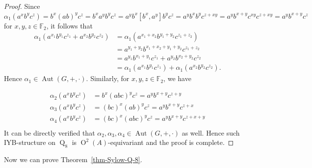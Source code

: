 \documentclass[12pt,a4paper]{article}
\DeclareMathOperator{\Oo}{O}
\DeclareMathOperator{\Aut}{Aut}
\DeclareMathOperator{\Q}{Q}
\theoremstyle{definition}
\begin{document}
\begin{proof}
Since $\alpha_1(a^xb^yc^z)=b^x(ab)^yc^z=b^xa^yb^yc^z=a^yb^x[b^x,a^y]b^yc^z
=a^yb^xb^yc^{z+xy}=a^yb^{x+y}c^{xy}c^{z+xy}=a^yb^{x+y}c^z$ for $x,y,z \in \mathbb{F}_2$, it follows that
$$
\begin{aligned}
\alpha_1(a^{x_1}b^{y_1}c^{z_1}+a^{x_2}b^{y_2}c^{z_2})&=\alpha_1(a^{x_1+x_2}b^{y_1+y_2}c^{z_1+z_2})\\
&=a^{y_1+y_2}b^{x_1+x_2+y_1+y_2}c^{z_1+z_2}\\
&=a^{y_1}b^{x_1+y_1}c^{z_1}+a^{y_2}b^{x_2+y_2}c^{z_2}\\
&=\alpha_1(a^{x_1}b^{y_1}c^{z_1})+\alpha_1(a^{x_2}b^{y_2}c^{z_2}).
\end{aligned}
$$
Hence $\alpha_1 \in \Aut(G,+,\cdot)$. Similarly, for $x,y,z \in \mathbb{F}_2$, we have

$$
\begin{aligned}
\alpha_2(a^xb^yc^z)&=b^x(abc)^yc^z=a^yb^{x+y}c^{z+y}\\
\alpha_3(a^xb^yc^z)&=(bc)^x(ab)^yc^z=a^yb^{x+y}c^{z+x}\\
\alpha_4(a^xb^yc^z)&=(bc)^x(abc)^yc^z=a^yb^{x+y}c^{z+x+y}\\
\end{aligned}
$$
It can be directly verified that $\alpha_2,\alpha_3,\alpha_4 \in \Aut(G,+,\cdot)$ as well. Hence such IYB-structure on $\Q_8$ is $\Oo^2(A)$-equivariant and the proof is complete.
\end{proof}

Now we can prove Theorem~\ref{thm-Sylow-Q-8}.
\end{document}
